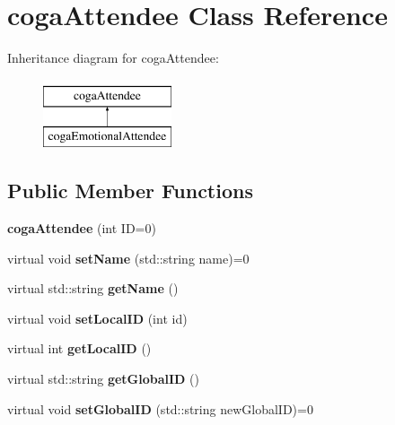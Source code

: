 \hypertarget{classcoga_attendee}{
\section{coga\-Attendee \-Class \-Reference}
\label{classcoga_attendee}
}
\-Inheritance diagram for coga\-Attendee\-:\begin{figure}[H]
\begin{center}
\leavevmode
\includegraphics[height=2.000000cm]{classcoga_attendee}
\end{center}
\end{figure}
\subsection*{\-Public \-Member \-Functions}
\begin{DoxyCompactItemize}
\item 
\hypertarget{classcoga_attendee_a5e52181e3f89aa3984d7557723bad7f7}{
{\bfseries coga\-Attendee} (int \-I\-D=0)}
\label{classcoga_attendee_a5e52181e3f89aa3984d7557723bad7f7}

\item 
\hypertarget{classcoga_attendee_a62daed668f89a2ef922d66028497175b}{
virtual void {\bfseries set\-Name} (std\-::string name)=0}
\label{classcoga_attendee_a62daed668f89a2ef922d66028497175b}

\item 
\hypertarget{classcoga_attendee_addf8c2744080cc33e0cb1772b9c2eca7}{
virtual std\-::string {\bfseries get\-Name} ()}
\label{classcoga_attendee_addf8c2744080cc33e0cb1772b9c2eca7}

\item 
\hypertarget{classcoga_attendee_a087404bec069467c4e956a3463ba267d}{
virtual void {\bfseries set\-Local\-I\-D} (int id)}
\label{classcoga_attendee_a087404bec069467c4e956a3463ba267d}

\item 
\hypertarget{classcoga_attendee_ab67a78cce68214cb860ab79ecdd8045d}{
virtual int {\bfseries get\-Local\-I\-D} ()}
\label{classcoga_attendee_ab67a78cce68214cb860ab79ecdd8045d}

\item 
\hypertarget{classcoga_attendee_a0a2a69e948ab07b78d27abeeb962cb36}{
virtual std\-::string {\bfseries get\-Global\-I\-D} ()}
\label{classcoga_attendee_a0a2a69e948ab07b78d27abeeb962cb36}

\item 
\hypertarget{classcoga_attendee_ab9e63e1232ce77ad2d5f19019521be2a}{
virtual void {\bfseries set\-Global\-I\-D} (std\-::string new\-Global\-I\-D)=0}
\label{classcoga_attendee_ab9e63e1232ce77ad2d5f19019521be2a}

\end{DoxyCompactItemize}
